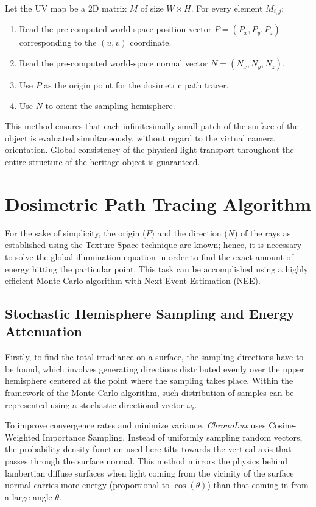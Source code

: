 Let the UV map be a 2D matrix $M$ of size $W \times H$. For every element $M_{i,j}$:
\begin{enumerate}
    \item Read the pre-computed world-space position vector $P = (P_x, P_y, P_z)$ corresponding to the $(u, v)$ coordinate.
    \item Read the pre-computed world-space normal vector $N = (N_x, N_y, N_z)$.
    \item Use $P$ as the origin point for the dosimetric path tracer.
    \item Use $N$ to orient the sampling hemisphere.
\end{enumerate}

This method ensures that each infinitesimally small patch of the surface of the object is evaluated simultaneously, without regard to the virtual camera orientation. Global consistency of the physical light transport throughout the entire structure of the heritage object is guaranteed.

\section{Dosimetric Path Tracing Algorithm}\label{sec:dosimetric_algorithm}
For the sake of simplicity, the origin ($P$) and the direction ($N$) of the rays as established using the Texture Space technique are known; hence, it is necessary to solve the global illumination equation in order to find the exact amount of energy hitting the particular point. This task can be accomplished using a highly efficient Monte Carlo algorithm with Next Event Estimation (NEE).

\subsection{Stochastic Hemisphere Sampling and Energy Attenuation}
Firstly, to find the total irradiance on a surface, the sampling directions have to be found, which involves generating directions distributed evenly over the upper hemisphere centered at the point where the sampling takes place. Within the framework of the Monte Carlo algorithm, such distribution of samples can be represented using a stochastic directional vector $\omega_i$.

To improve convergence rates and minimize variance, \textit{ChronoLux} uses Cosine-Weighted Importance Sampling. Instead of uniformly sampling random vectors, the probability density function used here tilts towards the vertical axis that passes through the surface normal. This method mirrors the physics behind lambertian diffuse surfaces when light coming from the vicinity of the surface normal carries more energy (proportional to $\cos(\theta)$) than that coming in from a large angle $\theta$.

